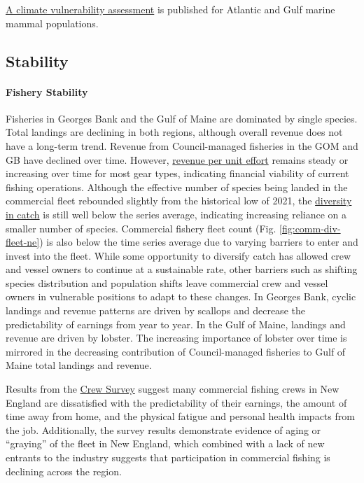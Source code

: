 \documentclass[
  10pt,
]{article}
\begin{document}
\href{https://journals.plos.org/plosone/article?id=10.1371/journal.pone.0290643}{A climate vulnerability assessment} is published for Atlantic and Gulf marine mammal populations.

\newpage

\subsection{Stability}\label{stability}

\paragraph{Fishery Stability}\label{fishery-stability}

Fisheries in Georges Bank and the Gulf of Maine are dominated by single species. Total landings are declining in both regions, although overall revenue does not have a long-term trend. Revenue from Council-managed fisheries in the GOM and GB have declined over time. However, \href{https://noaa-edab.github.io/catalog/effective_sweptarea.html}{revenue per unit effort} remains steady or increasing over time for most gear types, indicating financial viability of current fishing operations. Although the effective number of species being landed in the commercial fleet rebounded slightly from the historical low of 2021, the \href{https://noaa-edab.github.io/catalog/recdat.html}{diversity in catch} is still well below the series average, indicating increasing reliance on a smaller number of species. Commercial fishery fleet count (Fig. \ref{fig:comm-div-fleet-ne}) is also below the time series average due to varying barriers to enter and invest into the fleet. While some opportunity to diversify catch has allowed crew and vessel owners to continue at a sustainable rate, other barriers such as shifting species distribution and population shifts leave commercial crew and vessel owners in vulnerable positions to adapt to these changes. In Georges Bank, cyclic landings and revenue patterns are driven by scallops and decrease the predictability of earnings from year to year. In the Gulf of Maine, landings and revenue are driven by lobster. The increasing importance of lobster over time is mirrored in the decreasing contribution of Council-managed fisheries to Gulf of Maine total landings and revenue.

Results from the \href{https://noaa-edab.github.io/catalog/crew_survey.html}{Crew Survey} suggest many commercial fishing crews in New England are dissatisfied with the predictability of their earnings, the amount of time away from home, and the physical fatigue and personal health impacts from the job. Additionally, the survey results demonstrate evidence of aging or ``graying'' of the fleet in New England, which combined with a lack of new entrants to the industry suggests that participation in commercial fishing is declining across the region.
\end{document}
